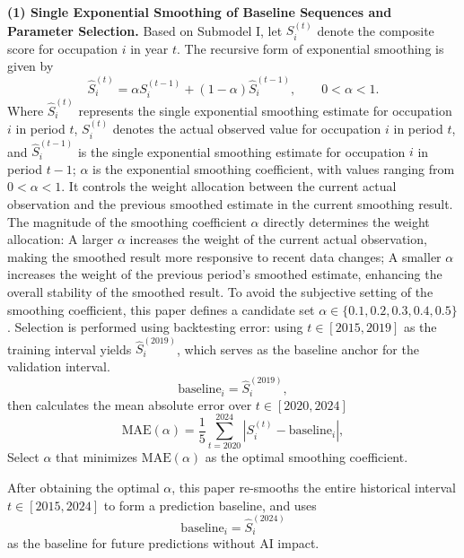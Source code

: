 \documentclass{mcmthesis}
\begin{document}
\noindent \textbf{(1) Single Exponential Smoothing of Baseline Sequences and Parameter Selection.}
Based on Submodel I, let $S_i^{(t)}$ denote the composite score for occupation $i$ in year $t$. The recursive form of exponential smoothing is given by
\begin{equation}
\widehat{S}_i^{(t)}
=\alpha S_i^{(t-1)}+(1-\alpha)\widehat{S}_i^{(t-1)},
\qquad 0<\alpha<1.
\label{eq:ses_S_cn}
\end{equation}
Where $\widehat{S}_i^{(t)}$ represents the single exponential smoothing estimate for occupation $i$ in period $t$, $S_i^{(t)}$ denotes the actual observed value for occupation $i$ in period $t$, and $\widehat{S}_i^{(t-1)}$ is the single exponential smoothing estimate for occupation $i$ in period $t-1$; $\alpha$ is the exponential smoothing coefficient, with values ranging from $0<\alpha<1$. It controls the weight allocation between the current actual observation and the previous smoothed estimate in the current smoothing result. The magnitude of the smoothing coefficient $\alpha$ directly determines the weight allocation: A larger $\alpha$ increases the weight of the current actual observation, making the smoothed result more responsive to recent data changes; A smaller $\alpha$ increases the weight of the previous period's smoothed estimate, enhancing the overall stability of the smoothed result.
To avoid the subjective setting of the smoothing coefficient, this paper defines a candidate set $\alpha \in \{0.1, 0.2, 0.3, 0.4, 0.5\}$. Selection is performed using backtesting error: using $t \in [2015, 2019]$ as the training interval yields $\widehat{S}_i^{(2019)}$, which serves as the baseline anchor for the validation interval.
\begin{equation}
\mathrm{baseline}_{i}=\widehat{S}_i^{(2019)},
\end{equation}
then calculates the mean absolute error over $t\in[2020,2024]$
\begin{equation}
\mathrm{MAE}(\alpha)=\frac{1}{5}\sum_{t=2020}^{2024}\left|S_i^{(t)}-\mathrm{baseline}_{i}\right|,
\label{eq:mae_alpha}
\end{equation}
Select $\alpha$ that minimizes $\mathrm{MAE}(\alpha)$ as the optimal smoothing coefficient.

After obtaining the optimal $\alpha$, this paper re-smooths the entire historical interval $t\in[2015,2024]$ to form a prediction baseline, and uses
\begin{equation}
\mathrm{baseline}_{i}=\widehat{S}_i^{(2024)}
\end{equation}
as the baseline for future predictions without AI impact.
\end{document}
